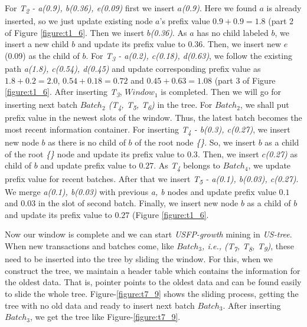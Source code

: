 \documentclass[conference]{IEEEtran}
\begin{document}
For \emph{T\textsubscript{2} - a(0.9), b(0.36), e(0.09)} first we insert \emph{$a$(0.9)}. Here we found \emph{$a$} is already inserted, so we just update existing node $a$'s prefix value $0.9 + 0.9 = 1.8$ (part 2 of Figure \ref{figure:t1_6}. Then we insert \emph{$b$(0.36)}. As \emph{$a$} has no child labeled \emph{$b$}, we insert a new child $b$ and update its prefix value to $0.36$. Then, we insert new $e$(0.09) as the child of \emph{$b$}. For \emph{T\textsubscript{3} - a(0.2), c(0.18), d(0.63)}, we follow the existing path \emph{a(1.8), c(0.54), d(0.45)} and update corresponding prefix value as $1.8 + 0.2 = 2.0$, $0.54 + 0.18 = 0.72$ and $0.45 + 0.63 = 1.08$ (part 3 of Figure \ref{figure:t1_6}. After inserting \emph{T\textsubscript{3}}, $Window_{1}$ is completed. Then we will go for inserting next batch \emph{$Batch_2$ (T\textsubscript{4}, T\textsubscript{5}, T\textsubscript{6})} in the tree. For \emph{$Batch_{2}$}, we shall put prefix value in the newest slots of the window. Thus, the latest batch becomes the most recent information container. For inserting \emph{T\textsubscript{4} - b(0.3), c(0.27)}, we insert new node \emph{$b$} as there is no child of $b$ of the root node \emph{\{\}}. So, we insert \emph{$b$} as a child of the root \emph{\{\}} node and update its prefix value to $0.3$. Then, we insert \emph{$c$(0.27)} as child of \emph{$b$} and update prefix value to $0.27$. As \emph{T\textsubscript{4}} belongs to \emph{$Batch_{4}$}, we update prefix value for recent batches. After that we insert \emph{T\textsubscript{5} - a(0.1), b(0.03), c(0.27)}. We merge \emph{a(0.1), b(0.03)} with previous \emph{a, b } nodes and update prefix value $0.1$ and $0.03$ in the slot of second batch. Finally, we insert new node \emph{$b$} as a child of \emph{$b$} and update its prefix value to $0.27$ (Figure \ref{figure:t1_6}.
    
Now our window is complete and we can start \emph{USFP-growth} mining in \emph {US-tree}. When new transactions and batches come, like \emph{$Batch_{3}$, i.e., (T\textsubscript{7}, T\textsubscript{8}, T\textsubscript{9})}, these need to be inserted into the tree by sliding the window. For this, when we construct the tree, we maintain a header table which contains the information for the oldest data. That is, pointer points to the oldest data and can be found easily to slide the whole tree. Figure-\ref{figure:t7_9} shows the sliding process, getting the tree with no old data and ready to insert next batch \emph{$Batch_{3}$}. After inserting \emph{$Batch_{3}$}, we get the tree like Figure-\ref{figure:t7_9}.
  
\end{document}

